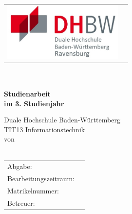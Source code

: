\begin{titlepage}

\begin{table}
\begin{tabular}{p{}p{}}
\hfill \includegraphics[width=6cm]{images/dhbw_logo.jpg} \\
\end{tabular}
\end{table}

	\begin{center}
		\vspace*{1cm}
		\LARGE\bf\myTopic\\
		\Large\rm\mySubTopic\\
		\vspace*{1cm}
		\bf Studienarbeit\\
		
		\normalsize\rm
		 im 3. Studienjahr \\
		\vspace*{1cm}
		
		Duale Hochschule Baden-Württemberg\\
		\vspace*{0.5cm}
		TIT13 Informationstechnik\\
		\vspace*{1cm}
		von\\
		 \myAutor\\
		\vspace*{1cm}
		
		\vfill
	\end{center}
	\begin{tabular}{ll}
		Abgabe:&\myEndDate\\
		Bearbeitungszeitraum:&\myEditDate\\
		Matrikelnummer:&\myMatNr\\
		
		Betreuer:&\myProf\\
		
	\end{tabular}
	\newline
	\vspace*{1cm}
\end{titlepage}
\newpage
\setcounter{page}{2}
